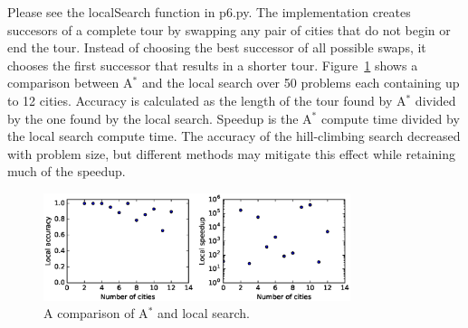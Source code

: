 \documentclass[12pt]{article}
\newenvironment{problem}[2][Problem]{\begin{trivlist}
\item[\hskip \labelsep {\bfseries #1}\hskip \labelsep {\bfseries #2.}]}{\end{trivlist}}
\begin{document}
\begin{problem}{6}
\begin{enumerate}
			Please see the localSearch function in p6.py.
			The implementation creates succesors of a complete tour by swapping any pair of cities that do not begin or end the tour.
			Instead of choosing the best successor of all possible swaps, it chooses the first successor that results in a shorter tour.
			Figure~\ref{fig:p6local} shows a comparison between A$^*$ and the local search over 50 problems each containing up to 12 cities.
			Accuracy is calculated as the length of the tour found by A$^*$ divided by the one found by the local search.
			Speedup is the A$^*$ compute time divided by the local search compute time.
			The accuracy of the hill-climbing search decreased with problem size, but different methods may mitigate this effect while retaining
			much of the speedup.
			\begin{figure}[h]
				\centering
				\includegraphics[width=0.8\textwidth]{fig/p6_local_h_0_cities_12_rand_True_iter_50_seed_0.eps}
				\caption{A comparison of A$^*$ and local search.}
				\label{fig:p6local}
			\end{figure}
	\end{enumerate}
\end{problem}
\end{document}
